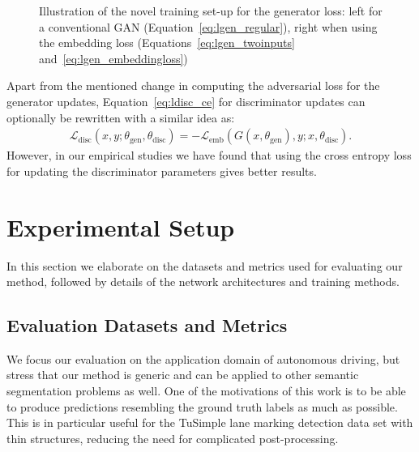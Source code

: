 \documentclass{article} \usepackage{nips13submit_e,times}
\begin{document}
\begin{figure}[t]
  \caption{Illustration of the novel training set-up for the generator loss: left for a conventional GAN (Equation~\ref{eq:lgen_regular}), right when using the embedding loss (Equations~\ref{eq:lgen_twoinputs} and~\ref{eq:lgen_embeddingloss})}
  \label{fig:gan_setup}
\end{figure}

Apart from the mentioned change in computing the adversarial loss for the generator updates, Equation~\ref{eq:ldisc_ce} for discriminator updates can optionally be rewritten with a similar idea as:
\begin{align}
\mathcal{L}_\text{disc}(x, y; \theta_\text{gen}, \theta_\text{disc}) = - \mathcal{L}_\text{emb}(G(x,\theta_\text{gen}),y;x,\theta_\text{disc}).
\label{eq:ldisc_emb}
\end{align}
However, in our empirical studies we have found that using the cross entropy loss for updating the discriminator parameters gives better results.



\section{Experimental Setup}
\label{sec:experimental_setup}

In this section we elaborate on the datasets and metrics used for evaluating our method, followed by details of the network architectures and training methods.



\subsection{Evaluation Datasets and Metrics}

We focus our evaluation on the application domain of autonomous driving, but stress that our method is generic and can be applied to other semantic segmentation problems as well.
One of the motivations of this work is to be able to produce predictions resembling the ground truth labels as much as possible.
This is in particular useful for the TuSimple lane marking detection data set with thin structures, reducing the need for complicated post-processing.
\end{document}
